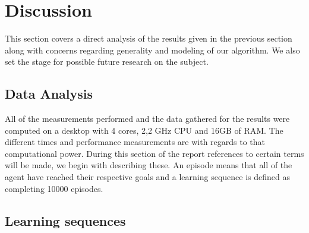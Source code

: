 \documentclass[journal,twoside]{IEEEtran}
\begin{document}

\section{Discussion}
This section covers a direct analysis of the results given in the previous section along with concerns regarding generality and modeling of our algorithm. We also set the stage for possible future research on the subject.

\subsection{Data Analysis}
All of the measurements performed and the data gathered for the results were computed on a desktop with 4 cores, 2,2 GHz CPU and 16GB of RAM. The different times and performance measurements are with regards to that computational power. During this section of the report references to certain terms will be made, we begin with describing these. An episode means that all of the agent have reached their respective goals and a learning sequence is defined as completing 10000 episodes.

\subsection{Learning sequences}
\end{document}
